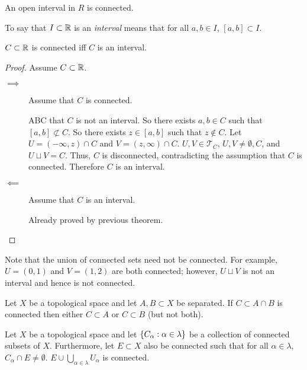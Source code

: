 \documentclass[letterpaper,12pt,fleqn]{article}
\newcommand{\T}{\mathscr{T}}
\renewcommand{\a}{\alpha}
\renewcommand{\l}{\lambda}
\begin{document}
\begin{corollary}
  An open interval in \(R\) is connected.
\end{corollary}

\begin{definition}[Interval]
  To say that \(I\subset\mathbb{R}\) is an \emph{interval} means that for all \(a,b\in I\), \([a,b]\subset I\).
\end{definition}

\begin{theorem}
  \(C\subset\mathbb{R}\) is connected iff \(C\) is an interval.
\end{theorem}

\begin{proof}
  Assume \(C\subset\mathbb{R}\).
  \begin{description}
  \item[\(\implies\)] Assume that \(C\) is connected.

    ABC that \(C\) is not an interval.  So there exists \(a,b\in C\) such that \([a,b]\not\subset C\).  So there
    exists \(z\in[a,b]\) such that \(z\notin C\).  Let \(U=(-\infty,z)\cap C\) and \(V=(z,\infty)\cap C\).
    \(U,V\in\T_C\), \(U,V\ne\emptyset,C\), and \(U\sqcup V=C\).  Thus, \(C\) is disconnected, contradicting the
    assumption that \(C\) is connected.  Therefore \(C\) is an interval.

  \item[\(\impliedby\)] Assume that \(C\) is an interval.

    Already proved by previous theorem.
  \end{description}
\end{proof}

Note that the union of connected sets need not be connected.  For example, \(U=(0,1)\) and \(V=(1,2)\) are
both connected; however, \(U\sqcup V\) is not an interval and hence is not connected.

\begin{theorem}
  Let \(X\) be a topological space and let \(A,B\subset X\) be separated.  If \(C\subset A\cap B\) is connected
  then either \(C\subset A\) or \(C\subset B\) (but not both).
\end{theorem}

\begin{theorem}
  Let \(X\) be a topological space and let \(\set{C_{\a}:\a\in\l}\) be a collection of connected subsets of \(X\).
  Furthermore, let \(E\subset X\) also be connected such that for all \(\a\in\l\), \(C_{\a}\cap E\ne\emptyset\).
  \(E\cup\bigcup_{\a\in\l}U_{\a}\) is connected.
\end{theorem}
\end{document}
